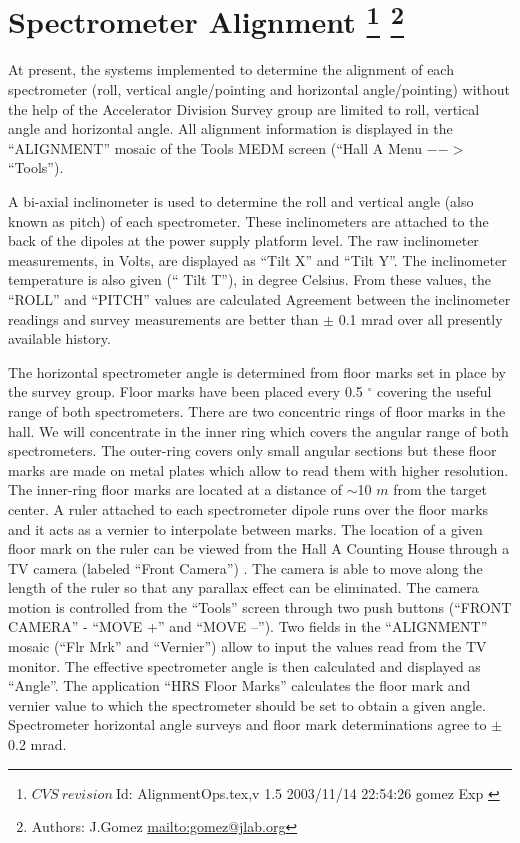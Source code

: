 \section[Spectrometer Alignment]{Spectrometer Alignment
\footnote{
  $CVS~revision~ $Id: AlignmentOps.tex,v 1.5 2003/11/14 22:54:26 gomez Exp $ $ 
}
\footnote{Authors: J.Gomez \url{mailto:gomez@jlab.org}}
}

At present, the systems implemented to determine the alignment of each spectrometer
(roll, vertical angle/pointing and horizontal angle/pointing) without the help of the
Accelerator Division Survey group are limited to roll, vertical angle and horizontal angle.
All alignment information is displayed in the ``ALIGNMENT'' mosaic of the Tools MEDM screen
(``Hall A Menu $-->$ ``Tools'').

A bi-axial inclinometer is used to determine the roll and vertical angle (also known as pitch)
of each spectrometer. These inclinometers are attached to the back of the dipoles at the power
supply platform level. The raw inclinometer measurements, in Volts,
are displayed as ``Tilt X'' and ``Tilt Y''. The inclinometer temperature is also given
(`` Tilt T''), in degree Celsius. From these values, the ``ROLL'' and ``PITCH'' values are
calculated
Agreement between the inclinometer readings and survey measurements
are better than $\pm$ 0.1 mrad over all presently available history.

The horizontal spectrometer angle is determined from floor marks set in
place by the survey group. Floor marks have been placed every 0.5 $^\circ$ covering the useful range of
both spectrometers.
There are two concentric rings of floor marks in the hall. We will concentrate in the
inner ring which covers the angular range of both spectrometers. The outer-ring covers only 
small angular sections but these floor marks are made on metal plates which allow 
to read them with higher resolution.
The inner-ring floor marks are located at a distance of $\sim$10 $m$ from the target center.
A ruler attached to each spectrometer dipole runs over the floor marks and it acts as a vernier to interpolate
between marks. The location of a given floor mark on the ruler can be viewed from the Hall A Counting
House through a TV camera (labeled ``Front Camera'') .
The camera is able to move along the length of the ruler so that any
parallax effect can be eliminated. The camera motion is controlled from the ``Tools'' screen
through two push buttons (``FRONT CAMERA'' - ``MOVE +'' and ``MOVE --'').
Two fields in the ``ALIGNMENT'' mosaic
(``Flr Mrk'' and ``Vernier'') allow to input
the values read from the TV monitor. The effective spectrometer angle is then calculated and displayed
as ``Angle''. The application ``HRS Floor Marks'' calculates the floor mark and vernier value
to which the spectrometer should be set
to obtain a given angle. Spectrometer horizontal angle surveys and floor mark determinations
agree to $\pm$ 0.2 mrad.

